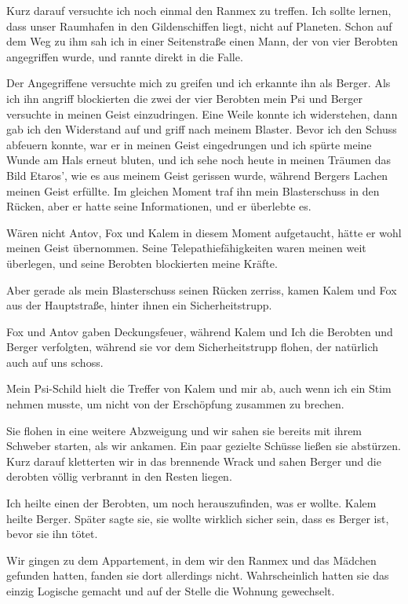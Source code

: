 \documentclass[11pt]{article}
\begin{document}
Kurz darauf versuchte ich noch einmal den Ranmex zu treffen. Ich sollte
lernen, dass unser Raumhafen in den Gildenschiffen liegt, nicht auf
Planeten. Schon auf dem Weg zu ihm sah ich in einer Seitenstraße einen
Mann, der von vier Berobten angegriffen wurde, und rannte direkt in die
Falle.

Der Angegriffene versuchte mich zu greifen und ich erkannte ihn als
Berger. Als ich ihn angriff blockierten die zwei der vier Berobten mein
Psi und Berger versuchte in meinen Geist einzudringen. Eine Weile konnte
ich widerstehen, dann gab ich den Widerstand auf und griff nach meinem
Blaster. Bevor ich den Schuss abfeuern konnte, war er in meinen Geist
eingedrungen und ich spürte meine Wunde am Hals erneut bluten, und ich
sehe noch heute in meinen Träumen das Bild Etaros', wie es aus meinem
Geist gerissen wurde, während Bergers Lachen meinen Geist erfüllte. Im
gleichen Moment traf ihn mein Blasterschuss in den Rücken, aber er hatte
seine Informationen, und er überlebte es.

Wären nicht Antov, Fox und Kalem in diesem Moment aufgetaucht, hätte er
wohl meinen Geist übernommen. Seine Telepathiefähigkeiten waren meinen
weit überlegen, und seine Berobten blockierten meine Kräfte.

Aber gerade als mein Blasterschuss seinen Rücken zerriss, kamen Kalem
und Fox aus der Hauptstraße, hinter ihnen ein Sicherheitstrupp.

Fox und Antov gaben Deckungsfeuer, während Kalem und Ich die Berobten
und Berger verfolgten, während sie vor dem Sicherheitstrupp flohen, der
natürlich auch auf uns schoss.

Mein Psi-Schild hielt die Treffer von Kalem und mir ab, auch wenn ich
ein Stim nehmen musste, um nicht von der Erschöpfung zusammen zu
brechen.

Sie flohen in eine weitere Abzweigung und wir sahen sie bereits mit
ihrem Schweber starten, als wir ankamen. Ein paar gezielte Schüsse
ließen sie abstürzen. Kurz darauf kletterten wir in das brennende Wrack
und sahen Berger und die derobten völlig verbrannt in den Resten liegen.

Ich heilte einen der Berobten, um noch herauszufinden, was er wollte.
Kalem heilte Berger. Später sagte sie, sie wollte wirklich sicher sein,
dass es Berger ist, bevor sie ihn tötet.

Wir gingen zu dem Appartement, in dem wir den Ranmex und das Mädchen
gefunden hatten, fanden sie dort allerdings nicht. Wahrscheinlich hatten
sie das einzig Logische gemacht und auf der Stelle die Wohnung
gewechselt.
\end{document}
